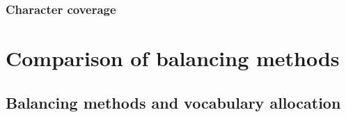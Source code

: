 

\subsubsection{Character coverage}



\section{Comparison of balancing methods}
\subsection{Balancing methods and vocabulary allocation}



